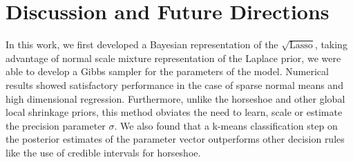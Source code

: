 \documentclass[10pt]{article}
\def\sql{$\sqrt{\text{Lasso}}$}
\begin{document}
%



\section{Discussion and Future Directions}\label{sec:future}

In this work, we first developed a Bayesian representation of the \sql, taking advantage of normal scale mixture representation of the Laplace prior, we were able to develop a Gibbs sampler for the parameters of the model. Numerical results showed satisfactory performance in the case of sparse normal means and high dimensional regression. Furthermore, unlike the horseshoe and other global local shrinkage priors, this method obviates the need to learn, scale or estimate the precision parameter $\sigma$. We also found that a k-means classification step on the posterior estimates of the parameter vector outperforms other decision rules like the use of credible intervals for horseshoe. 
\end{document}
